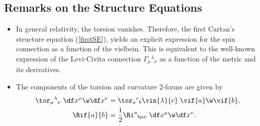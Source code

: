 \subsection*{Remarks on the Structure Equations}

\begin{itemize}
\item In general relativity, the torsion vanishes. Therefore, the first Cartan's structure equation (\ref{firstSE}), yields an explicit expression for the spin connection as a function of the vielbein. This is equivalent to the well-known expression of the Levi-Civita connection $\Gamma_\mu{}^\lambda{}_\nu$ as a function of the metric and its derivatives.
\item The components of the torsion and curvature 2-forms are given by
  \begin{align}
    \tor_\mu{}^\lambda{}_\nu \;\df x^\mu\w\df x^\nu &= \tor_a{}^c{}_b \vin{\lambda}{c}\;\vif{a}\w\vif{b},\\
    \Rif{a}{b} &= \frac{1}{2}\Ri^a{}_{b\mu\nu}\;\df x^\mu\w\df x^\nu.
  \end{align}
\end{itemize}

